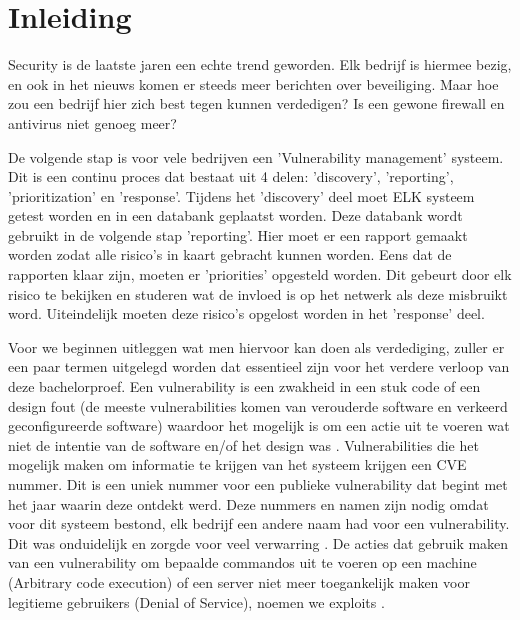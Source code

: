 
\chapter{Inleiding}
\label{ch:inleiding}

Security is de laatste jaren een echte trend geworden. Elk bedrijf is hiermee bezig, en ook in het nieuws komen er steeds meer berichten over beveiliging. Maar hoe zou een bedrijf hier zich best tegen kunnen verdedigen? Is een gewone firewall en antivirus niet genoeg meer?

De volgende stap is voor vele bedrijven een 'Vulnerability management' systeem. Dit is een continu proces dat bestaat uit 4 delen:  'discovery', 'reporting', 'prioritization' en 'response'. Tijdens het 'discovery' deel moet ELK systeem getest worden en in een databank geplaatst worden. Deze databank wordt gebruikt in de volgende stap 'reporting'. Hier moet er een rapport gemaakt worden zodat alle risico's in kaart gebracht kunnen worden. Eens dat de rapporten klaar zijn, moeten er 'priorities' opgesteld worden. Dit gebeurt door elk risico te bekijken en studeren wat de invloed is op het netwerk als deze misbruikt word. Uiteindelijk moeten deze risico's opgelost worden in het 'response' deel. \textcite{Tripwire}

Voor we beginnen uitleggen wat men hiervoor kan doen als verdediging, zuller er een paar termen uitgelegd worden dat essentieel zijn voor het verdere verloop van deze bachelorproef. Een vulnerability is een zwakheid in een stuk code of een design fout (de meeste vulnerabilities komen van verouderde software en verkeerd geconfigureerde software) waardoor het mogelijk is om een actie uit te voeren wat niet de intentie van de software en/of het design was \textcite{Techtarget-vuln}. Vulnerabilities die het mogelijk maken om informatie te krijgen van het systeem krijgen een CVE nummer. Dit is een uniek nummer voor een publieke vulnerability dat begint met het jaar waarin deze ontdekt werd. Deze nummers en namen zijn nodig omdat voor dit systeem bestond, elk bedrijf een andere naam had voor een vulnerability. Dit was onduidelijk en zorgde voor veel verwarring \textcite{cve-mitre}. De acties dat gebruik maken van een vulnerability om bepaalde commandos uit te voeren op een machine (Arbitrary code execution) of een server niet meer toegankelijk maken voor legitieme gebruikers (Denial of Service), noemen we exploits \textcite{Techtarget-exploit}.

